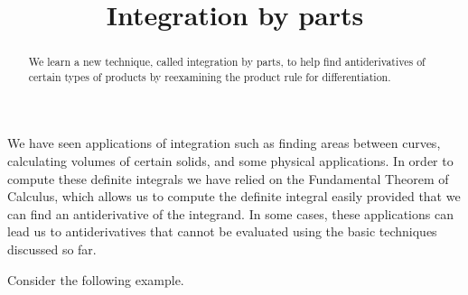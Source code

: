 \documentclass{ximera}
\title[Dig-In:]{Integration by parts}
\begin{document}
\begin{abstract}
  We learn a new technique, called integration by parts, to help find antiderivatives of certain types of products by reexamining the product rule for differentiation.
\end{abstract}
\maketitle

We have seen applications of integration such as finding areas between curves, calculating volumes of certain solids, and some physical applications. In order to compute these definite integrals we have relied on the Fundamental Theorem of Calculus, which allows us to compute the definite integral easily provided that we can find an antiderivative of the integrand.  In some cases, these applications can lead us to antiderivatives that cannot be evaluated using the basic techniques discussed so far.

Consider the following example.
\end{document}
